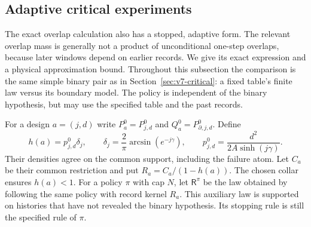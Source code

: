 \subsection{Adaptive critical experiments}
\label{sec:v16-adaptive-critical}
The exact overlap calculation also has a stopped, adaptive form. The
relevant overlap mass is generally not a product of unconditional
one-step overlaps, because later windows depend on earlier records.
We give its exact expression and a physical approximation bound.
Throughout this subsection the comparison is the same simple binary
pair as in Section~\ref{sec:v7-critical}: a fixed table's finite law
versus its boundary model. The policy is independent of the binary
hypothesis, but may use the specified table and the past records.

For a design $a=(j,d)$ write $P_a^0=P_{j,d}^0$ and
$Q_a^0=P_{\partial,j,d}^0$. Define
\begin{equation}\label{eq:v16-overlap-hazard}
 h(a)=p_{j,d}^0\delta_j,
 \qquad \delta_j=\frac2\pi\arcsin(e^{-j\gamma}),\qquad
 p_{j,d}^0=\frac{d^2}{2A\sinh(j\gamma)}.
\end{equation}
Their densities agree on the common support, including the failure
atom. Let $C_a$ be their common restriction and put
$R_a=C_a/(1-h(a))$. The chosen collar ensures $h(a)<1$.
For a policy $\pi$ with cap $N$, let $\mathsf R^\pi$ be the law
obtained by following the same policy with record kernel $R_a$.
This auxiliary law is supported on histories that have not revealed
the binary hypothesis. Its stopping rule is still the specified rule
of $\pi$.

